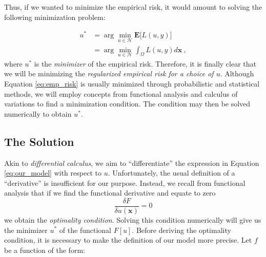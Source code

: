 \documentclass{INGUADY}
\begin{document}
Thus, if we wanted to minimize the empirical risk, it would amount to solving the following minimization problem:

\begin{align} \label{eq:emp_risk}
u^* &= \arg\min_{u \in \mathcal{H}} \mathbf{E} \big[  L(u, y)  \big]  \\
&= \arg\min_{u \in \mathcal{H}} \int_\Omega L(u, y) d\mathbf{x} \ ,
\end{align}
where $u^*$ is the \textit{minimizer} of the empirical risk.
Therefore, it is finally clear that we will be minimizing the \textit{regularized empirical risk for a choice of $u$}. Although Equation \ref{eq:emp_risk} is usually minimized through probabilistic and statistical methods, we will employ concepts from functional analysis and calculus of variations to find a minimization condition. The condition may then be solved numerically to obtain $u^*$.

\subsection{The Solution}
Akin to \textit{differential calculus}, we aim to ``differentiate'' the expression in Equation \ref{eq:our_model} with respect to $u$. Unfortunately, the usual definition of a ``derivative'' is insufficient for our purpose. Instead, we recall from functional analysis that if we find the functional derivative and equate to zero
\begin{equation*}
\dfrac{\delta F}{\delta u(\mathbf{x})} = 0
\end{equation*}
we obtain the \textit{optimality condition}. Solving this condition numerically will give us the minimizer $u^*$ of the functional $F[u]$. Before deriving the optimality condition, it is necessary to make the definition of our model more precise. Let $f$ be a function of the form:
\end{document}
